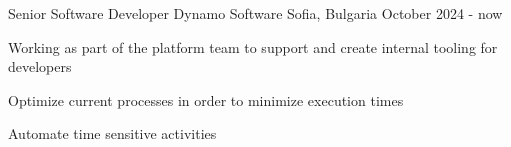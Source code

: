 

\begin{cventries}

  \cventry
    {Senior Software Developer} %
    {Dynamo Software} %
    {Sofia, Bulgaria} %
    {October 2024 - now} %
    {
      \begin{cvitems} %
        \item {Working as part of the platform team to support and create  internal tooling for developers }
        \vspace{0.7em} %
          \item {Optimize current processes in order to minimize execution times }
        \vspace{0.7em} %
        \item {Automate time sensitive activities }
        \vspace{0.7em} %
      \end{cvitems}
    }


\end{cventries}
